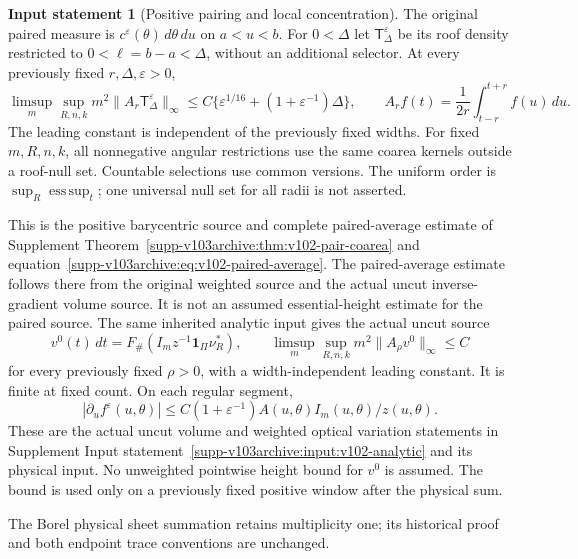 \documentclass[11pt,reqno]{amsart}
\numberwithin{equation}{section}
\theoremstyle{definition}\newtheorem{definition}[theorem]{Definition}
\newtheorem{inputstatement}[theorem]{Input statement}
\theoremstyle{remark}\newtheorem{remark}[theorem]{Remark}
\newcommand{\one}{\mathbf1}\newcommand{\dd}{\,\mathrm d}
\newcommand{\esssup}{\operatorname*{ess\,sup}}
\begin{document}
\begin{inputstatement}[Positive pairing and local concentration]
\label{input:v104-pair}
The original paired measure is
$c^\varepsilon(\theta)\,d\theta\,du$ on $a<u<b$.
For $0<\Delta$ let $\mathsf T_\Delta^\varepsilon$ be its roof
density restricted to $0<\ell=b-a<\Delta$, without an additional
selector. At every previously fixed $r,\Delta,\varepsilon>0$,
\begin{equation}\label{eq:v104-paired-average}
 \limsup_m\sup_{R,n,k}m^2
       \|A_r\mathsf T_\Delta^\varepsilon\|_\infty
 \le C\{\varepsilon^{1/16}+(1+\varepsilon^{-1})\Delta\},
 \qquad A_rf(t)=\frac1{2r}\int_{t-r}^{t+r}f(u)\,du.
\end{equation}
The leading constant is independent of the previously fixed widths.
For fixed $m,R,n,k$, all nonnegative angular restrictions use the
same coarea kernels outside a roof-null set. Countable selections
use common versions. The uniform order is $\sup_R\esssup_t$;
one universal null set for all radii is not asserted.
\end{inputstatement}
This is the positive barycentric source and complete paired-average
estimate of Supplement Theorem~\ref{supp-v103archive:thm:v102-pair-coarea}
and equation~\eqref{supp-v103archive:eq:v102-paired-average}.
The paired-average estimate follows there from the original weighted
source and the actual uncut inverse-gradient volume source. It is
not an assumed essential-height estimate for the paired source.
The same inherited analytic input gives the actual uncut source
\begin{equation}\label{eq:v104-uncut-input}
 v^0(t)\,dt=F_\#(I_m z^{-1}\one_\Pi\nu_R^*),\qquad
 \limsup_m\sup_{R,n,k}m^2\|A_\rho v^0\|_\infty\le C
\end{equation}
for every previously fixed $\rho>0$, with a width-independent leading
constant. It is finite at fixed count. On each regular segment,
\begin{equation}\label{eq:v104-weighted-variation-input}
 |\partial_u f^\varepsilon(u,\theta)|
 \le C(1+\varepsilon^{-1})A(u,\theta)I_m(u,\theta)/z(u,\theta).
\end{equation}
These are the actual uncut volume and weighted optical variation
statements in Supplement Input statement~\ref{supp-v103archive:input:v102-analytic}
and its physical input. No unweighted pointwise height bound for
$v^0$ is assumed. The bound is used only on a previously fixed
positive window after the physical sum.

The Borel physical sheet summation retains multiplicity one; its
historical proof and both endpoint trace conventions are unchanged.
\end{document}
